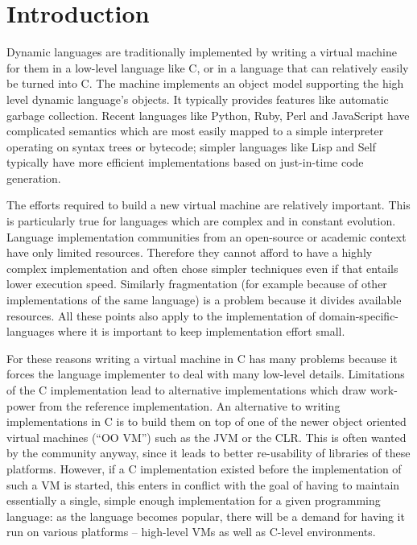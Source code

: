 \documentclass{llncs}
\begin{document}
\section{Introduction}

Dynamic languages are traditionally implemented by writing a virtual
machine for them in a low-level language like C, or in a language that
can relatively easily be turned into C.  The machine implements an
object model supporting the high level dynamic language's objects.  It
typically provides features like automatic garbage collection.  Recent
languages like Python, Ruby, Perl and JavaScript have complicated
semantics which are most easily mapped to a simple interpreter operating
on syntax trees or bytecode; simpler languages like Lisp and Self
typically have more efficient implementations based on just-in-time code
generation.

The efforts required to build a new virtual machine are relatively
important.  This is particularly true for languages which are complex
and in constant evolution. Language implementation communities from an
open-source or academic context have only limited resources. Therefore they
cannot afford to have a highly complex implementation and often chose simpler
techniques even if that entails lower execution speed. Similarly fragmentation
(for example because of other implementations of the same language) is a
problem because it divides available resources. All these points also apply to
the implementation of domain-specific-languages where it is important to keep
implementation effort small.

For these reasons writing a virtual machine in C has many problems because it
forces the language implementer to deal with many low-level details. Limitations
of the C implementation lead to alternative implementations which draw
work-power from the reference implementation. An alternative to writing
implementations in C is to build them on top of one of the newer object oriented
virtual machines (``OO VM'') such as the JVM or the CLR. This is often wanted by
the community anyway, since it leads to better re-usability of libraries of
these platforms. However, if a C implementation existed before the
implementation of such a VM is started, this enters in conflict with the goal of
having to maintain essentially a single, simple enough implementation for a
given programming language: as the language becomes popular, there will be a
demand for having it run on various platforms – high-level VMs as well as
C-level environments.
\end{document}
